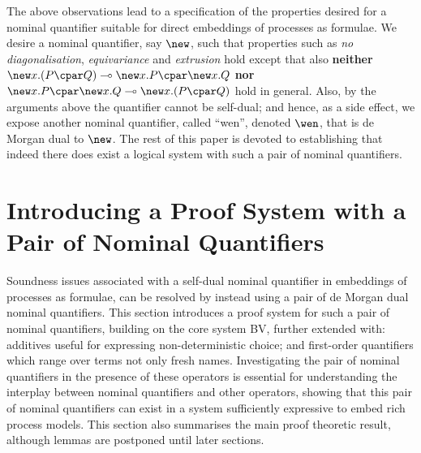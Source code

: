 \documentclass[UKenglish,acmsmall,authorversion]{acmart}
\theoremstyle{plain}
\begin{document}
The above observations lead to a specification of the properties desired for a nominal quantifier suitable for direct embeddings of processes as formulae.
We desire a nominal quantifier, say $\new$, such that properties such as \textit{no diagonalisation}, \textit{equivariance} and \textit{extrusion} hold except that
also 
\textbf{neither} 
$
\mathopen{\new x.} \left(P \cpar Q \right)
\multimap
\new x.P \cpar \new x.Q
$
\textbf{nor}
$
\new x.P \cpar \new x.Q
\multimap
\mathopen{\new x.} \left(P \cpar Q \right)
$
hold in general.
Also, by the arguments above the quantifier cannot be self-dual;
and hence, as a side effect, we expose another nominal quantifier, called ``wen'', denoted $\wen$, that is de Morgan dual to $\new$.
The rest of this paper is devoted to establishing that indeed there does exist a logical system with such a pair of nominal quantifiers.




\section{Introducing a Proof System with a Pair of Nominal Quantifiers}
\label{section:syntax}

Soundness issues associated with a self-dual nominal quantifier in embeddings of processes as formulae, can be resolved by instead using a pair of de Morgan dual nominal quantifiers.
This section introduces a proof system for such a pair of nominal quantifiers, 
building on the core system \textsf{BV}, further extended with: additives useful for expressing non-deterministic choice; and first-order quantifiers which range over terms not only fresh names.
Investigating the pair of nominal quantifiers in the presence of these operators is essential for understanding  the interplay between nominal quantifiers and other operators, showing that this pair of nominal quantifiers can exist in a system sufficiently expressive to embed rich process models.
This section also summarises the main proof theoretic result, although lemmas are postponed until later sections.

\end{document}
